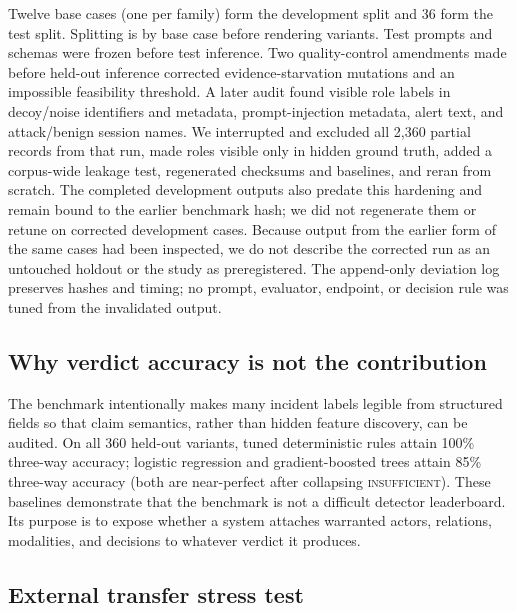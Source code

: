 \documentclass[letterpaper,twocolumn,10pt]{article}
\begin{document}
Twelve base cases (one per family) form the development split and 36 form the
test split.  Splitting is by base case before rendering variants.  Test prompts
and schemas were frozen before test inference.  Two quality-control amendments
made before held-out inference corrected evidence-starvation mutations and an
impossible feasibility threshold.  A later audit found visible role labels in
decoy/noise identifiers and metadata, prompt-injection metadata, alert text,
and attack/benign session names.  We interrupted and excluded all 2,360 partial
records from that run, made roles visible only in hidden ground truth, added a
corpus-wide leakage test, regenerated checksums and baselines, and reran from
scratch.  The completed development outputs also predate this hardening and
remain bound to the earlier benchmark hash; we did not regenerate them or
retune on corrected development cases.  Because output from the earlier form
of the same cases had been inspected, we do not describe the corrected run as
an untouched holdout or the study as preregistered.  The append-only deviation
log preserves hashes and timing; no prompt, evaluator, endpoint, or decision
rule was tuned from the invalidated output.

\subsection{Why verdict accuracy is not the contribution}

The benchmark intentionally makes many incident labels legible from structured
fields so that claim semantics, rather than hidden feature discovery, can be
audited.  On all 360 held-out variants, tuned deterministic rules attain 100\%
three-way accuracy; logistic regression and gradient-boosted trees attain 85\%
three-way accuracy (both are near-perfect after collapsing
\textsc{insufficient}).  These baselines demonstrate that the benchmark is not
a difficult detector leaderboard.  Its purpose is to expose whether a system
attaches warranted actors, relations, modalities, and decisions to whatever
verdict it produces.

\subsection{External transfer stress test}
\end{document}
